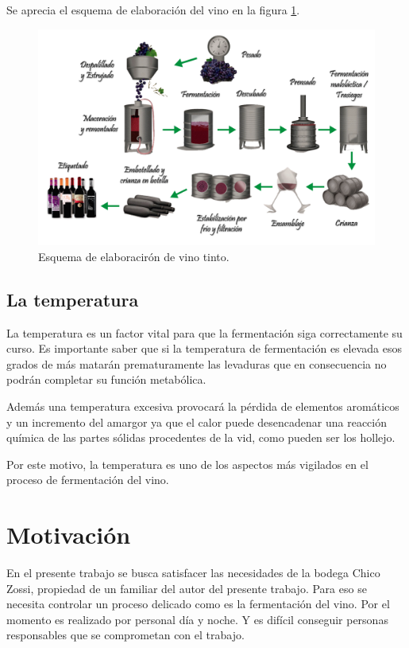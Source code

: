 Se aprecia el esquema de elaboración del vino en la figura \ref{fig:winep}.

\begin{figure}[hp]
  \centering
  \includegraphics[scale=.3]{./Figures/elaboracion-del-vino-tinto.png}
  \caption{Esquema de elaboracirón de vino tinto.}
  \label{fig:winep}
\end{figure}


\subsection{La temperatura}

  La temperatura es un factor vital para que la fermentación siga correctamente su curso. Es importante saber que si la temperatura de fermentación es elevada esos grados de más matarán prematuramente las levaduras que en consecuencia no podrán completar su función metabólica.

 Además una temperatura excesiva provocará la pérdida de elementos aromáticos y un incremento del amargor ya que el calor puede desencadenar una reacción química de las partes sólidas procedentes de la vid, como pueden ser los hollejo.

  Por este motivo, la temperatura es uno de los aspectos más vigilados en el proceso de fermentación del vino. 


\section{Motivación}

En el presente trabajo se busca satisfacer las necesidades de la bodega Chico Zossi, propiedad de un familiar del autor del presente trabajo.
Para eso se necesita controlar un proceso delicado como es la fermentación del vino. Por el momento es realizado por personal día y noche. Y es difícil conseguir personas responsables que se comprometan con el trabajo. 

